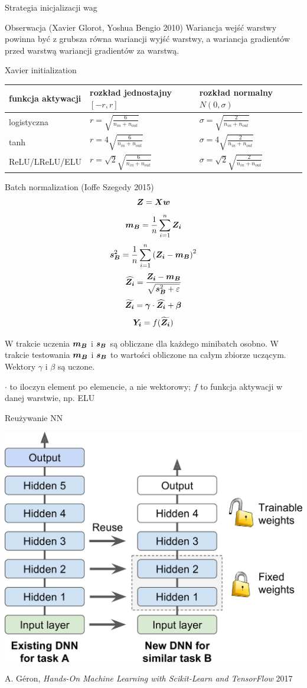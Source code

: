 \documentclass{sa}
\renewcommand{\vec}[1]{\ensuremath\boldsymbol{#1}}
\begin{document}
\begin{frame}{Strategia inicjalizacji wag}
\begin{block}{Obserwacja (Xavier Glorot, Yoshua Bengio 2010)}
Wariancja wejść warstwy powinna  być z grubsza równa wariancji wyjść warstwy, a wariancja gradientów przed warstwą wariancji gradientów za warstwą.
\end{block}
\pause
\vfill
\alert{Xavier initialization} \\
\begin{tabular}{p{}p{}p{}}
funkcja aktywacji & rozkład jednostajny $[-r,r]$ & rozkład normalny $N(0, \sigma)$ \\
\hline
logistyczna & $r=\sqrt{\frac{6}{n_{in}+n_{out}}}$ & $\sigma=\sqrt{\frac{2}{n_{in}+n_{out}}}$ \\
tanh & $r=4\sqrt{\frac{6}{n_{in}+n_{out}}}$ & $\sigma=4\sqrt{\frac{2}{n_{in}+n_{out}}}$ \\
ReLU/LReLU/ELU & $r=\sqrt{2}\sqrt{\frac{6}{n_{in}+n_{out}}}$ & $\sigma=\sqrt{2}\sqrt{\frac{2}{n_{in}+n_{out}}}$ \\
\end{tabular}
\end{frame}

\begin{frame}{Batch normalization (Ioffe Szegedy 2015)}
\[\vec{Z} = \vec{Xw} \]
\pause
\[\vec{m_B} = \frac{1}{n} \sum_{i=1}^{n} \vec{Z_i} \]
\pause
\[\vec{s_B}^2 = \frac{1}{n} \sum_{i=1}^{n} \left(\vec{Z_i}-\vec{m_B}\right)^2 \]
\pause
\[\widehat{\vec{Z_i}} = \frac{\vec{Z_i}-\vec{m_B}}{\sqrt{\vec{s_B}^2+\varepsilon}} \]
\pause
\[\vec{\widetilde{Z_i}} = \vec{\gamma} \cdot \widehat{\vec{Z_i}}+\vec{\beta}\]
\pause
\[\vec{Y_i} = f(\vec{\widetilde{Z_i}}) \]
{
W trakcie uczenia $\vec{m_B}$ i $\vec{s_B}$ są obliczane dla każdego minibatch osobno. W trakcie testowania $\vec{m_B}$ i $\vec{s_B}$ to wartości obliczone na całym zbiorze uczącym.
Wektory $\gamma$ i $\beta$ są uczone.

$\cdot$ to iloczyn element po elemencie, a nie wektorowy; $f$ to funkcja aktywacji w danej warstwie, np. ELU
}
\end{frame}

\begin{frame}{Reużywanie NN}
\begin{center}
\includegraphics[width=.7\textwidth]{reusing.png}
\end{center}
{\vfill\footnotesize A. Géron, \emph{Hands-On Machine Learning with Scikit-Learn and TensorFlow} 2017}
\end{frame}
\end{document}
